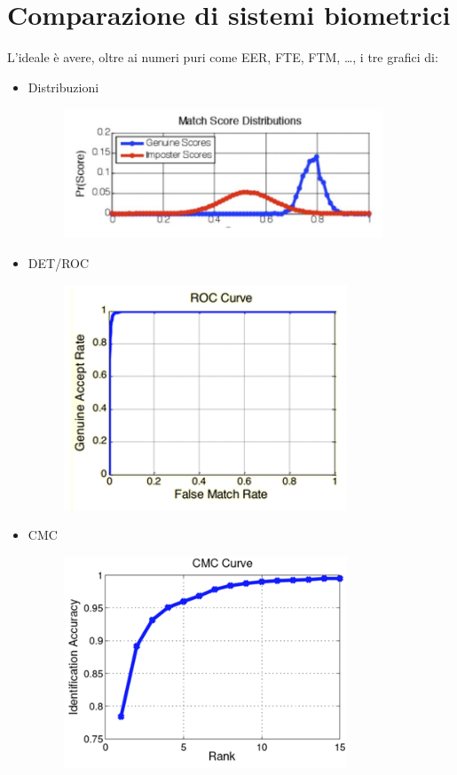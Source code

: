 \documentclass{report}
\begin{document}
\chapter{Comparazione di sistemi biometrici}
L'ideale è avere, oltre ai numeri puri come EER, FTE, FTM, \dots, i tre 
grafici di:
\begin{itemize}
    \item Distribuzioni
    
    \begin{figure}[H]
        \centering
        \includegraphics[width=0.8\linewidth]{images/distribuzioni.png}
    \end{figure}
    \item DET/ROC
    
    \begin{figure}[H]
        \centering
        \includegraphics[width=0.6\linewidth]{images/det.png}
    \end{figure}
    \item CMC
    
    \begin{figure}[ht]
        \centering
        \includegraphics[width=0.6\linewidth]{images/cmc.png}
    \end{figure}
\end{itemize}
\end{document}
